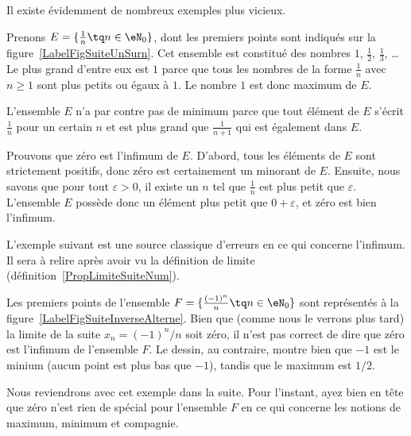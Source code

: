 Il existe évidemment de nombreux exemples plus vicieux.

\begin{example}
	Prenons $E=\{ \frac{1}{ n }\tq n\in\eN_0 \}$, dont les premiers points sont indiqués sur la figure~\ref{LabelFigSuiteUnSurn}. Cet ensemble est constitué des nombres $1$, $\frac{ 1 }{2}$, $\frac{1}{ 3 }$, \ldots Le plus grand d'entre eux est $1$ parce que tous les nombres de la forme $\frac{1}{ n }$ avec $n\geq 1$ sont plus petits ou égaux à $1$. Le nombre $1$ est donc maximum de $E$.

	L'ensemble $E$ n'a par contre pas de minimum parce que tout élément de $E$ s'écrit $\frac{1}{ n }$ pour un certain $n$ et est plus grand que $\frac{1}{ n+1 }$ qui est également dans $E$.

	Prouvons que zéro est l'infimum de $E$. D'abord, tous les éléments de $E$ sont strictement positifs, donc zéro est certainement un minorant de $E$. Ensuite, nous savons que pour tout $\varepsilon>0$, il existe un $n$ tel que $\frac{1}{ n }$ est plus petit que $\varepsilon$. L'ensemble $E$ possède donc un élément plus petit que $0+\varepsilon$, et zéro est bien l'infimum.
\end{example}

\newcommand{\CaptionFigSuiteUnSurn}{Les premiers points du type $x_n=1/n$.}


L'exemple suivant est une source classique d'erreurs en ce qui concerne l'infimum. Il sera à relire après avoir vu la définition de limite (définition~\ref{PropLimiteSuiteNum}).

\begin{example}
	Les premiers points de l'ensemble $F=\{ \frac{ (-1)^n }{ n }\tq n\in\eN_0 \}$ sont représentés à la figure~\ref{LabelFigSuiteInverseAlterne}. Bien que (comme nous le verrons plus tard) la limite de la suite $x_n=(-1)^n/n$ soit zéro, il n'est pas correct de dire que zéro est l'infimum de l'ensemble $F$. Le dessin, au contraire, montre bien que $-1$ est le minium (aucun point est plus bas que $-1$), tandis que le maximum est $1/2$.

	Nous reviendrons avec cet exemple dans la suite. Pour l'instant, ayez bien en tête que zéro n'est rien de spécial pour l'ensemble $F$ en ce qui concerne les notions de maximum, minimum et compagnie.
\end{example}
\newcommand{\CaptionFigSuiteInverseAlterne}{Les quelques premiers points du type $(-1)^n/n$.}



